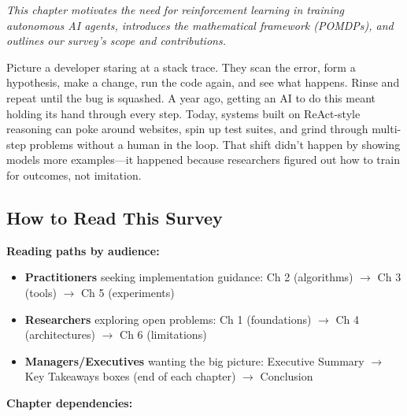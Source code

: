 \documentclass[12pt,a4paper]{report}
\theoremstyle{definition}
\begin{document}
\textit{This chapter motivates the need for reinforcement learning in training autonomous AI agents, introduces the mathematical framework (POMDPs), and outlines our survey's scope and contributions.}

\vspace{0.3cm}

Picture a developer staring at a stack trace. They scan the error, form a hypothesis, make a change, run the code again, and see what happens. Rinse and repeat until the bug is squashed. A year ago, getting an AI to do this meant holding its hand through every step. Today, systems built on ReAct-style reasoning \cite{yao2023react} can poke around websites, spin up test suites, and grind through multi-step problems without a human in the loop. That shift didn't happen by showing models more examples---it happened because researchers figured out how to train for outcomes, not imitation.

\subsection*{How to Read This Survey}

\textbf{Reading paths by audience:}
\begin{itemize}
    \item \textbf{Practitioners} seeking implementation guidance: Ch 2 (algorithms) $\rightarrow$ Ch 3 (tools) $\rightarrow$ Ch 5 (experiments)
    \item \textbf{Researchers} exploring open problems: Ch 1 (foundations) $\rightarrow$ Ch 4 (architectures) $\rightarrow$ Ch 6 (limitations)
    \item \textbf{Managers/Executives} wanting the big picture: Executive Summary $\rightarrow$ Key Takeaways boxes (end of each chapter) $\rightarrow$ Conclusion
\end{itemize}

\textbf{Chapter dependencies:}
\begin{center}
\end{center}
\end{document}
